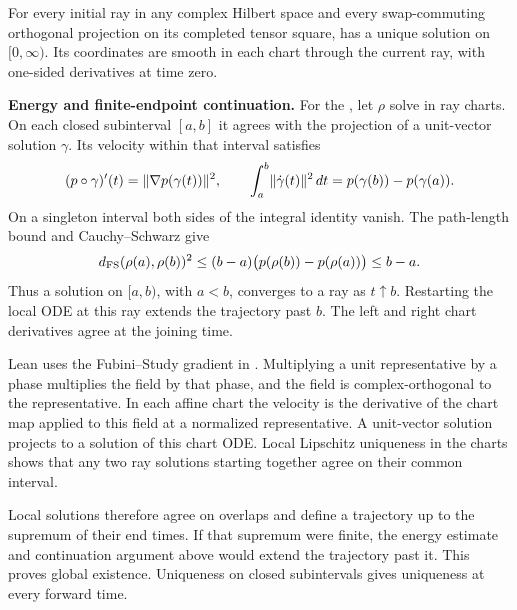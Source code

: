 \begin{lemma}\label{lem:flow-existence}
  \leanok
  \par
  For every initial ray in any complex Hilbert space and every swap-commuting
  orthogonal projection on its completed tensor square,
   has a unique solution on $[0,\infty)$. Its
  coordinates are smooth in each chart through the current ray, with
  one-sided derivatives at time zero.

  \textbf{Energy and finite-endpoint continuation.}
  For the ,
  let $\rho$ solve  in ray charts. On each closed
  subinterval $[a,b]$ it agrees with the projection of a unit-vector solution
  $\gamma$. Its velocity within that interval satisfies
  \[
    (p\circ\gamma)'(t)=\lVert \nabla p(\gamma(t)) \rVert^2,\qquad
    \int_a^b \lVert \dot\gamma(t) \rVert^2\,dt
      = p(\gamma(b))-p(\gamma(a)).
  \]
  On a singleton interval both sides of the integral identity vanish.
  The path-length bound and Cauchy--Schwarz give
  \[
    d_{\rm FS}(\rho(a),\rho(b))^2
    \le (b-a)\bigl(p(\rho(b))-p(\rho(a))\bigr)\le b-a .
  \]
  Thus a solution on $[a,b)$, with $a<b$, converges to a ray as $t\uparrow b$.
  Restarting the local ODE at this ray extends the trajectory past $b$.
  The left and right chart derivatives agree at the joining time.

  Lean uses the Fubini--Study gradient in .
  Multiplying a unit representative by a phase multiplies the field by
  that phase, and the field is complex-orthogonal to the representative.
  In each affine chart the velocity is the derivative of the chart map
  applied to this field at a normalized representative. A unit-vector
  solution projects to a solution of this chart ODE. Local Lipschitz
  uniqueness in the charts shows that any two ray solutions starting
  together agree on their common interval.

  Local solutions therefore agree on overlaps and define a trajectory up
  to the supremum of their end times. If that supremum were finite, the
  energy estimate and continuation argument above
  would extend the trajectory past it. This proves global existence.
  Uniqueness on closed subintervals gives uniqueness at every forward time.
\end{lemma}


